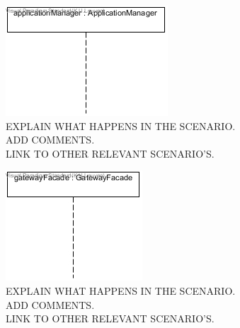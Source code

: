     \begin{figure}[!htp]
    	\centering
    	\includegraphics[width=\textwidth]{images/sequence-Av2}
    	\caption[Application crash]{EXPLAIN WHAT HAPPENS IN THE SCENARIO. \\ ADD COMMENTS. \\ LINK TO OTHER RELEVANT SCENARIO'S. }\label{fig:seq_scenario5}
    \end{figure}

    \begin{figure}[!htp]
    	\centering
    	\includegraphics[width=\textwidth]{images/sequence-U2-UC4}
    	\caption[Plugging in a new pluggable device (sensor or actuator)]{EXPLAIN WHAT HAPPENS IN THE SCENARIO. \\ ADD COMMENTS. \\ LINK TO OTHER RELEVANT SCENARIO'S. }\label{fig:seq_scenario6}
    \end{figure}

